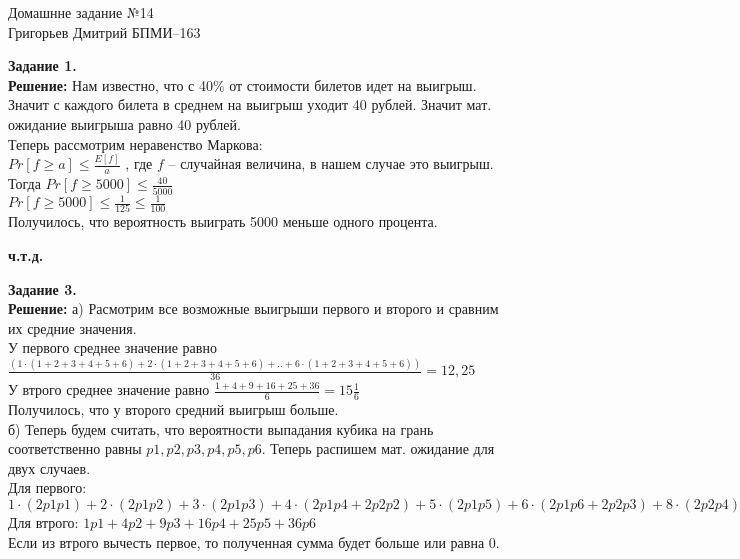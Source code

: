 \documentclass[12pt,a4paper]{scrartcl}
\begin{document}
	\begin{center}	
		Домашнне задание №14 \\
		Григорьев Дмитрий БПМИ--163
	\end{center}
	\textbf{Задание 1.} \\	
	\textbf{Решение:}
		Нам известно, что с 40\% от стоимости билетов идет на выигрыш. Значит с каждого билета в среднем на выигрыш уходит 40 рублей. Значит мат. ожидание выигрыша равно 40 рублей. \\
		Теперь рассмотрим неравенство Маркова: \\
		$Pr[f \geqslant a] \leqslant \frac{E[f]}{a}$ , где $f$ -- 	случайная величина, в нашем случае это выигрыш. \\
		Тогда $Pr[f \geqslant 5000] \leqslant \frac{40}{5000}$ \\
		$Pr[f \geqslant 5000] \leqslant \frac{1}{125} \leqslant 		\frac{1}{100}$\\
		Получилось, что вероятность выиграть 5000 меньше одного процента.\\
	\begin{flushright}	
		\textbf{ч.т.д.}
	\end{flushright} 
	\textbf{Задание 3.} 
	\\
	\textbf{Решение:}
	а) Расмотрим все возможные выигрыши первого и второго и сравним их средние значения. \\
	У первого среднее значение равно $\frac{(1 \cdot (1 + 2 + 3 + 4 + 5 + 6) + 2 \cdot (1 + 2 + 3 + 4 + 5 + 6) + .. + 6 \cdot (1 + 2 + 3 + 4 + 5 + 6))}{36} = 12,25$ \\
	У втрого среднее значение равно $\frac{1 + 4 + 9 + 16 + 25 + 36}{6} = 15\frac{1}{6}$ \\
	Получилось, что у второго средний выигрыш больше.\\
	б) Теперь будем считать, что вероятности выпадания кубика на грань соответственно равны $p1, p2, p3, p4, p5, p6$. Теперь распишем мат. ожидание для двух случаев. \\
	Для первого:
	$1\cdot(2p1p1) + 2\cdot(2p1p2) + 3\cdot(2p1p3) + 4\cdot(2p1p4 + 2p2p2) + 5\cdot(2p1p5) + 6\cdot(2p1p6 + 2p2p3) + 8\cdot(2p2p4) + 10\cdot(2p2p5) + 12\cdot(2p2p6 + 2p3p4) + 15\cdot(2p3p5) + 16\cdot(2p4p4) + 18\cdot(2p3p6) + 20\cdot(2p4p5) + 24\cdot(2p4p6) + 25\cdot(2p5p5) + 30\cdot(2p5p6) + 36\cdot(2p6p6)$ \\
	Для втрого: $1p1 + 4p2 + 9p3 + 16p4 + 25p5 + 36p6$\\
	Если из втрого вычесть первое, то полученная сумма будет больше или равна 0. \\
\end{document}
